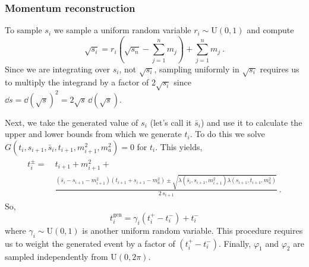 \subsubsection{Momentum reconstruction}

To sample $s_i$ we sample a uniform random variable $r_i \sim \mathrm{U}(0,1)$ and compute
\begin{equation}
    \sqrt{s_i} = r_i \left(\sqrt{s_n} - \sum_{j=1}^{n} m_j\right) + \sum_{j=1}^{n} m_j\ .
\end{equation}
Since we are integrating over $s_i$, not $\sqrt{s_i}$, sampling uniformly in $\sqrt{s_i}$ requires us to multiply the integrand by a factor of $2 \sqrt{s_i}$ since $\dd s = \dd (\sqrt{s})^2 = 2 \sqrt{s} \, \dd (\sqrt{s})$.

Next, we take the generated value of $s_i$ (let's call it $\bar{s}_{i}$) and use it to calculate the upper and lower bounds from which we generate $t_i$.
\newline To do this we solve
$G(t_{i}, s_{i+1}, \bar{s}_{i}, t_{i+1}, m_{i+1}^2, m_a^2) = 0$ for $t_{i}$. 
This yields,
\begin{gather}
    \begin{aligned}
        t_{i}^{\pm} 
        =\ 
        &t_{i+1} + m_{i+1}^2 + \\
        &
        \frac{
            (\bar{s}_{i} - s_{i+1} - m_{i+1}^2)(t_{i+1} + s_{i+1} - m_a^2) \pm \sqrt{\lambda(\bar{s}_{i}, s_{i+1}, m_{i+1}^2)\lambda(s_{i+1},t_{i+1},m_a^2)}
        }
        {2\,s_{i+1}} \ .
    \end{aligned} 
\end{gather}
So,
\begin{equation}
    t_i^{\mathrm{gen}} = \gamma_i (t_i^+ - t_i^-) + t_i^-
\end{equation}
where $\gamma_i \sim \mathrm{U}(0,1)$ is another uniform random variable. 
This procedure requires us to weight the generated event by a factor of $(t_i^{+} - t_i^{-})$. Finally, $\varphi_1$ and $\varphi_2$ are sampled independently from $\mathrm{U}(0,2\pi)$.

